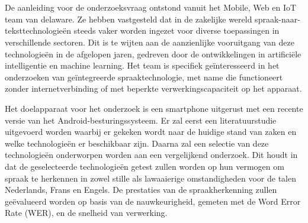 
\chapter{}%
\label{ch:inleiding}


De aanleiding voor de onderzoeksvraag ontstond vanuit het Mobile, Web en IoT team van delaware. Ze hebben vastgesteld dat in de zakelijke wereld spraak-naar-teksttechnologieën steeds vaker worden ingezet voor diverse toepassingen in verschillende sectoren. Dit is te wijten aan de aanzienlijke vooruitgang van deze technologieën in de afgelopen jaren, gedreven door de ontwikkelingen in artificiële intelligentie en machine learning. Het team is specifiek geïnteresseerd in het onderzoeken van geïntegreerde spraaktechnologie, met name die functioneert zonder internetverbinding of met beperkte verwerkingscapaciteit op het apparaat.
\newline

Het doelapparaat voor het onderzoek is een smartphone uitgerust met een recente versie van het Android-besturingssysteem. Er zal eerst een literatuurstudie uitgevoerd worden waarbij er gekeken wordt naar de huidige stand van zaken en welke technologieën er beschikbaar zijn. Daarna zal een selectie van deze technologieën onderworpen worden aan een vergelijkend onderzoek. Dit houdt in dat de geselecteerde technologieën getest zullen worden op hun vermogen om spraak te herkennen in zowel stille als lawaaierige omstandigheden voor de talen Nederlands, Frans en Engels. De prestaties van de spraakherkenning zullen geëvalueerd worden op basis van de nauwkeurigheid, gemeten met de Word Error Rate (WER), en de snelheid van verwerking.
\newline


